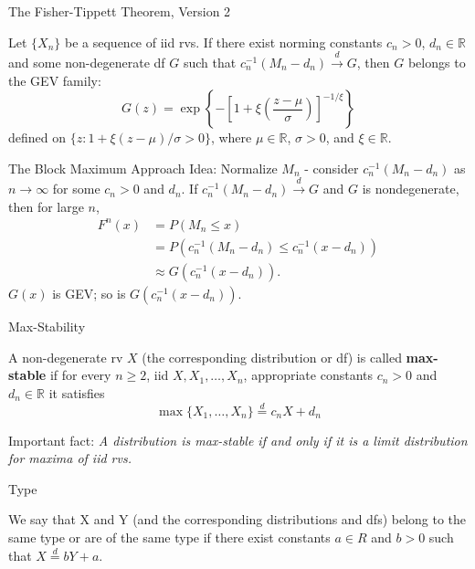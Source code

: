 \documentclass{beamer}
\begin{document}
\begin{frame}{The Fisher-Tippett Theorem, Version 2}
    \begin{theorem}
        Let $\{X_n\}$ be a sequence of iid rvs. If there exist norming constants $c_n > 0$, $d_n \in \mathbb{R}$ and some non-degenerate df $G$ such that $c_n^{-1}(M_n - d_n) \xrightarrow{d} G$, then $G$ belongs to the GEV family:
        \[
        G(z) = \exp\left\{-\left[1 + \xi\left(\frac{z - \mu}{\sigma}\right)\right]^{-1 / \xi}\right\}
        \]
        defined on $\{z : 1 + \xi(z - \mu) / \sigma > 0\}$, where $\mu \in \mathbb{R}$, $\sigma > 0$, and $\xi \in \mathbb{R}$.
    \end{theorem}
\end{frame}

\begin{frame}{The Block Maximum Approach}
    Idea: Normalize $M_n$ - consider $c_n^{-1}(M_n - d_n)$ as $n \to \infty$ for some $c_n > 0$ and $d_n$. If $c_n^{-1}(M_n - d_n) \xrightarrow{d} G$ and $G$ is nondegenerate, then for large $n$,
    \begin{align*}
        F^n(x) &= P(M_n \le x) \\
        &= P(c_n^{-1}(M_n - d_n) \le c_n^{-1}(x - d_n)) \\
        &\approx G(c_n^{-1}(x - d_n)).
    \end{align*}
    $G(x)$ is GEV; so is $G(c_n^{-1}(x - d_n))$.
\end{frame}

\begin{frame}{Max-Stability}
    \begin{definition}
        A non-degenerate rv $X$ (the corresponding distribution or df) is called \textbf{max-stable} if for every $n \ge 2$, iid $X, X_1, \ldots, X_n$, appropriate constants $c_n > 0$ and $d_n \in \mathbb{R}$ it satisfies
        \[
        \max\{X_1, \ldots, X_n\} \overset{d}{=} c_n X + d_n
        \]
    \end{definition}
    Important fact: \textit{A distribution is max-stable if and only if it is a limit distribution for maxima of iid rvs.}
\end{frame}

\begin{frame}{Type}
    \begin{definition}
        We say that X and Y (and the corresponding distributions and dfs) belong to the same type or are of the same type if there exist constants $a \in R$ and $b > 0$ such that $X \overset{d}{=} b Y + a$.
    \end{definition}
\end{frame}
\end{document}
